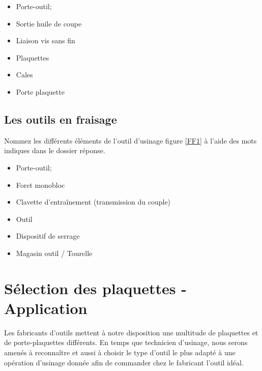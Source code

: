 \documentclass[12pt]{article}
\newcounter{exo}
\newenvironment{exo}{\stepcounter{exo}\vspace{0.5cm}{\bfseries Question \theexo\ :}}{\par\vspace{0.5cm}}
\begin{document}
\begin{minipage}{.55\linewidth}
\begin{itemize}
    \item Porte-outil;
    \item Sortie huile de coupe
    \item Liaison vis sans fin
\end{itemize} 
\end{minipage}
\begin{minipage}{.44\linewidth}
\begin{itemize}
    \item Plaquettes
    \item Cales
    \item Porte plaquette
\end{itemize} 
\end{minipage}




\subsection{Les outils en fraisage}


\begin{exo} Nommez les différents éléments de l’outil d’usinage figure \ref{FF1} à l'aide des mots
indiques dans le dossier réponse. \end{exo}



\begin{minipage}{.55\linewidth}
\begin{itemize}
    \item Porte-outil;
    \item Foret monobloc
    \item Clavette d'entraînement (transmission du couple)
\end{itemize} 
\end{minipage}
\begin{minipage}{.44\linewidth}
\begin{itemize}
    \item Outil
    \item Dispositif de serrage
    \item Magasin outil / Tourelle
\end{itemize} 
\end{minipage}


\section{Sélection des plaquettes - Application}
Les fabricants d’outils mettent à notre disposition une multitude de plaquettes et de porte-plaquettes différents. En temps que technicien d’usinage, nous serons amenés à reconnaître et aussi à choisir le type d’outil le plus adapté à une opération d’usinage donnée afin de commander chez le fabricant l’outil idéal.
\end{document}
